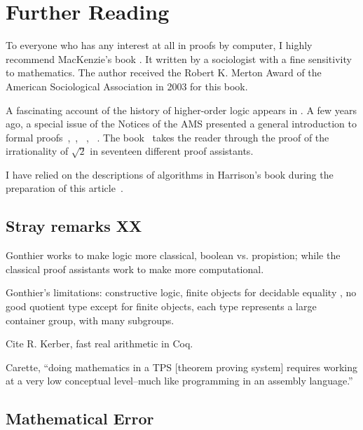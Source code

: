 \documentclass{llncs}
\begin{document}
\section{Further Reading}

To everyone who has any interest at all in proofs by computer, I
highly recommend MacKenzie's book \cite{Mac}.  It written by a
sociologist with a fine sensitivity to mathematics.  The author
received the Robert K. Merton Award of the American Sociological
Association in 2003 for this book.

A fascinating account of the history of higher-order logic appears in
\cite{Gor}.  A few years ago, a special issue of the Notices of the
AMS presented a general introduction to formal
proofs~\cite{Hales:2008:formal},~\cite{Harrison:2008:formal},
~\cite{gonthier:2008:formal}, ~\cite{Wiedijk:2008:formal}.  The
book~\cite{wiedijk:17} takes the reader through the proof of the
irrationality of $\sqrt2$ in seventeen different proof assistants.

I have relied on the descriptions of algorithms in
Harrison's book during the preparation of this article~\cite{Ha09}.


\subsection{Stray remarks XX}

Gonthier works to make logic more classical, boolean vs. propistion;
while the classical proof assistants work to make more computational.

Gonthier's limitations: constructive logic, finite objects for
decidable equality , no good quotient type except for finite objects,
each type represents a large container group, with many subgroups.

Cite R. Kerber, fast real arithmetic in Coq.

Carette, ``doing mathematics in a TPS [theorem proving system]
requires working at a very low
conceptual level--much like programming in an assembly language.''



\subsection{Mathematical Error}
\end{document}
